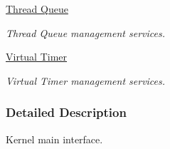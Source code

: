 \begin{DoxyCompactItemize}
\hyperlink{group__kern__thdq}{Thread Queue}
\begin{DoxyCompactList}\small\item\em Thread Queue management services. \end{DoxyCompactList}\item 
\hyperlink{group__kern__vtmr}{Virtual Timer}
\begin{DoxyCompactList}\small\item\em Virtual Timer management services. \end{DoxyCompactList}\end{DoxyCompactItemize}


\subsubsection{Detailed Description}
Kernel main interface. 